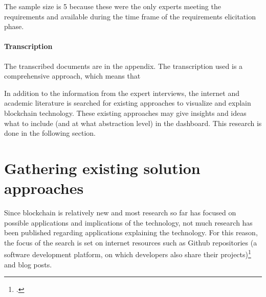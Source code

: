 The sample size is 5 because these were the only experts meeting the requirements and available during the time frame of the requirements elicitation phase.

\paragraph{Transcription} The transcribed documents are in the appendix. The transcription used is a comprehensive approach, which means that 

In addition to the information from the expert interviews, the internet and academic literature is searched for existing approaches to visualize and explain blockchain technology. These existing approaches may give insights and ideas what to include (and at what abstraction level) in the dashboard. This research is done in the following section.

\section{Gathering existing solution approaches}

Since blockchain is relatively new and most research so far has focused on possible applications and implications of the technology, not much research has been published regarding applications explaining the technology. For this reason, the focus of the search is set on internet resources such as Github repositories (a software development platform, on which developers also share their projects)\footcite[Cf.][]{GithubHowdevelopers} and blog posts.

